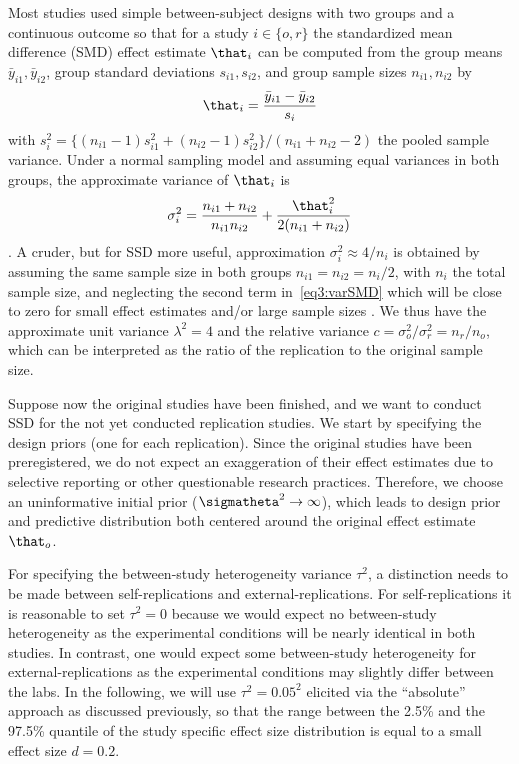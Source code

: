 Most studies used simple between-subject designs with two groups and a
continuous outcome so that for a study $i \in \{o, r\}$ the standardized mean
difference (SMD) effect estimate $\that_{i}$ can be computed from the group
means $\bar{y}_{i1}, \bar{y}_{i2}$, group standard deviations $s_{i1}, s_{i2}$,
and group sample sizes $n_{i1}, n_{i2}$ by
\begin{align*}
  \that_{i} = \frac{\bar{y}_{i1} - \bar{y}_{i2}}{s_{i}}
\end{align*}
with
$s^{2}_{i} = \{(n_{i1} - 1)s_{i1}^{2} + (n_{i2} - 1)s_{i2}^{2}\}/(n_{i1} + n_{i2} - 2)$
the pooled sample variance. Under a normal sampling model and assuming equal
variances in both groups, the approximate variance of $\that_{i}$ is
\begin{align}
  \sigma^{2}_{i} = \frac{n_{i1} + n_{i2}}{n_{i1}n_{i2}} + \frac{\that_{i}^{2}}{2(n_{i1} + n_{i2})}
  \label{eq3:varSMD}
\end{align}
\citep{Hedges1981}. A cruder, but for SSD more useful, approximation
$\sigma^{2}_{i} \approx 4/n_{i}$ is obtained by assuming the same sample size in
both groups $n_{i1} = n_{i2} = n_{i}/2$, with $n_{i}$ the total sample size, and
neglecting the second term in~\eqref{eq3:varSMD} which will be close to zero for
small effect estimates and/or large sample sizes \citep{Hedges2021}. We thus
have the approximate unit variance $\lambda^{2} = 4$ and the relative variance
$c = \sigma^{2}_{o}/\sigma^{2}_{r} = n_{r}/n_{o}$,
which can be interpreted as the ratio of the replication to the original sample
size.


Suppose now the original studies have been finished, and we want to conduct SSD
for the not yet conducted replication studies. We start by specifying the design
priors (one for each replication). Since the original studies have been
preregistered, we do not expect an exaggeration of their effect estimates due to
selective reporting or other questionable research practices. Therefore, we
choose an uninformative initial prior ($\sigmatheta^{2} \to \infty$), which
leads to design prior and predictive distribution both centered around the
original effect estimate $\that_{o}$.

For specifying the between-study heterogeneity variance $\tau^{2}$, a
distinction needs to be made between self-replications and
external-replications. For self-replications it is reasonable to set
$\tau^{2} = 0$ because we would expect no between-study heterogeneity as the
experimental conditions will be nearly identical in both studies. In contrast,
one would expect some between-study heterogeneity for external-replications as
the experimental conditions may slightly differ between the labs. In the
following, we will use $\tau^{2} = 0.05^{2}$ elicited via
the ``absolute'' approach as discussed previously,
so that the range between the 2.5\% and the 97.5\% quantile of the study
specific effect size distribution is equal to a small effect size $d = 0.2$.

